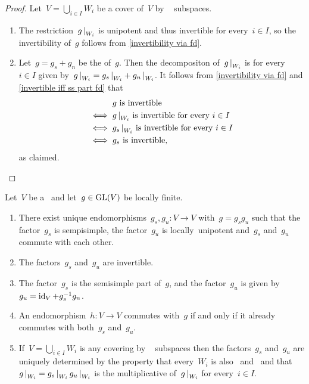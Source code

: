 \begin{proof}
  Let~$V = \bigcup_{i \in I} W_i$ be a cover of~$V$ by {\fd}~ subspaces.
  \begin{enumerate}
    \item
      The restriction~$\restrict{g}{W_i}$ is unipotent and thus invertible for every~$i \in I$, so the invertibility of~$g$ follows from \cref{invertibility via fd}.
    \item
      Let~$g = g_s + g_n$ be the {\JCD} of~$g$.
      Then the {\JCD} decompositon of~$\restrict{g}{W_i}$ is for every~$i \in I$ given by~$\restrict{g}{W_i} = \restrict{g_s}{W_i} + \restrict{g_n}{W_i}$.
      It follows from \cref{invertibility via fd} and \cref{invertible iff ss part fd} that
      \begin{align*}
              & \text{$g$ is invertible}  \\
        \iff{}& \text{$\restrict{g}{W_i}$ is invertible for every~$i \in I$}  \\
        \iff{}& \text{$\restrict{g_s}{W_i}$ is invertible for every~$i \in I$}  \\
        \iff{}& \text{$g_s$ is invertible},
      \end{align*}
      as claimed.
    \qedhere
  \end{enumerate}
\end{proof}


\begin{proposition}
  \label{local mjcd}
  Let~$V$ be a~{\kvs} and let~$g \in \operatorname{GL}(V)$ be locally finite.
  \begin{enumerate}
    \item
      \label{the local mjcd itself}
      There exist unique endomorphisms~$g_s, g_u \colon V \to V$ with~$g = g_s g_u$ such that the factor~$g_s$ is sempisimple, the factor~$g_u$ is locally~unipotent and~$g_s$ and~$g_u$ commute with each other.
    \item
      \label{invertibility of local factors}
      The factors~$g_s$ and~$g_u$ are invertible.
    \item
      \label{global description of local mjcd}
      The factor~$g_s$ is the semisimple part of~$g$, and the factor~$g_u$ is given by~$g_u = \operatorname{id}_V + g_s^{-1} g_n$.
    \item
      \label{commutativity via local mjcd}
      An endomorphism~$h \colon V \to V$ commutes with~$g$ if and only if it already commutes with both~$g_s$ and~$g_u$.
    \item
      \label{local mjcd via cover}
      If~$V = \bigcup_{i \in I} W_i$ is any covering by {\fd}~ subspaces then the factors~$g_s$ and~$g_u$ are uniquely determined by the property that every~$W_i$ is also~ and~ and that~$\restrict{g}{W_i} = \restrict{g_s}{W_i} \, \restrict{g_u}{W_i}$ is the multiplicative {\JCD} of~$\restrict{g}{W_i}$ for every~$i \in I$.
  \end{enumerate}
\end{proposition}


